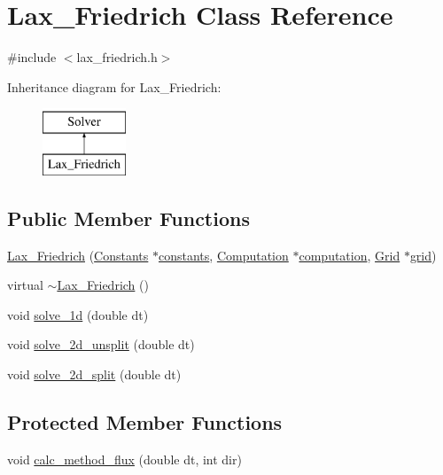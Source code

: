 \hypertarget{classLax__Friedrich}{\section{Lax\-\_\-\-Friedrich Class Reference}
\label{classLax__Friedrich}
}


{\ttfamily \#include $<$lax\-\_\-friedrich.\-h$>$}

Inheritance diagram for Lax\-\_\-\-Friedrich\-:\begin{figure}[H]
\begin{center}
\leavevmode
\includegraphics[height=2.000000cm]{classLax__Friedrich}
\end{center}
\end{figure}
\subsection*{Public Member Functions}
\begin{DoxyCompactItemize}
\item 
\hyperlink{classLax__Friedrich_ae81b6a1af98230c75ed8f11b99f95532}{Lax\-\_\-\-Friedrich} (\hyperlink{classConstants}{Constants} $\ast$\hyperlink{classSolver_af8791d3a5042e7be5980ae3247cb60de}{constants}, \hyperlink{classComputation}{Computation} $\ast$\hyperlink{classSolver_a158efd10f04099b8be28561f990b646a}{computation}, \hyperlink{classGrid}{Grid} $\ast$\hyperlink{classSolver_a147ba19192faf8f24dadfc569f3d403f}{grid})
\item 
virtual \hyperlink{classLax__Friedrich_ad069bf434093eba9f5fa1c6d02d93dfd}{$\sim$\-Lax\-\_\-\-Friedrich} ()
\item 
void \hyperlink{classLax__Friedrich_aff4e2d9fd2a38de402e96ce4f0e1c1bc}{solve\-\_\-1d} (double dt)
\item 
void \hyperlink{classLax__Friedrich_ae7aff2026dbcc2a731119a5ff541b4ab}{solve\-\_\-2d\-\_\-unsplit} (double dt)
\item 
void \hyperlink{classLax__Friedrich_a0086e60fef8bbb1d8ba1cd5b228a90f6}{solve\-\_\-2d\-\_\-split} (double dt)
\end{DoxyCompactItemize}
\subsection*{Protected Member Functions}
\begin{DoxyCompactItemize}
\item 
void \hyperlink{classLax__Friedrich_a77ace0aa368e5b04263b23a69d2b3fe7}{calc\-\_\-method\-\_\-flux} (double dt, int dir)
\end{DoxyCompactItemize}
